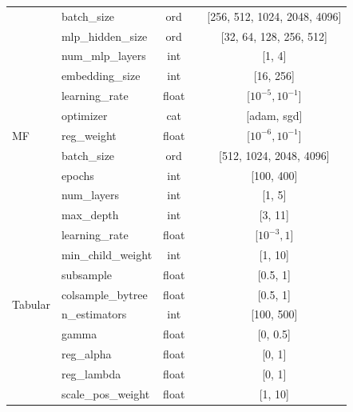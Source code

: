 \documentclass{article}
\newcommand{\cmark}{\ding{51}} %
\newcommand{\xmark}{\ding{55}} %
\begin{document}
\begin{longtable}{@{}p{}lccc@{}}
                                 & batch\_size        & ord   & \textcolor{crosscolor}{\xmark} & [256, 512, 1024, 2048, 4096] \\
                                 & mlp\_hidden\_size  & ord   & \textcolor{crosscolor}{\xmark} & [32, 64, 128, 256, 512] \\
                                 & num\_mlp\_layers   & int   & \textcolor{crosscolor}{\xmark} & [1, 4] \\
\midrule
\multirow{7}{*}{MF} & embedding\_size    & int   & \textcolor{crosscolor}{\xmark} & [16, 256] \\
                                 & learning\_rate     & float & \textcolor{checkcolor}{\cmark} & [$10^{-5}, 10^{-1}$] \\
                                 & optimizer            & cat   & \textcolor{crosscolor}{\xmark} & [adam, sgd] \\
                                 & reg\_weight        & float & \textcolor{checkcolor}{\cmark} & [$10^{-6}, 10^{-1}$] \\
                                 & batch\_size        & ord   & \textcolor{crosscolor}{\xmark} & [512, 1024, 2048, 4096] \\
                                 & epochs             & int   & \textcolor{crosscolor}{\xmark} & [100, 400] \\
                                 & num\_layers          & int   & \textcolor{crosscolor}{\xmark} & [1, 5] \\
\midrule
\multirow{10}{*}{Tabular} & max\_depth           & int   & \textcolor{crosscolor}{\xmark} & [3, 11] \\
                                  & learning\_rate       & float & \textcolor{checkcolor}{\cmark} & [$10^{-3}, 1$] \\
                                  & min\_child\_weight   & int   & \textcolor{crosscolor}{\xmark} & [1, 10] \\
                                  & subsample            & float & \textcolor{crosscolor}{\xmark} & [0.5, 1] \\
                                  & colsample\_bytree    & float & \textcolor{crosscolor}{\xmark} & [0.5, 1] \\
                                  & n\_estimators & int & \textcolor{crosscolor}{\xmark} & [100, 500] \\
& gamma & float & \textcolor{crosscolor}{\xmark} & [0, 0.5] \\
& reg\_alpha & float & \textcolor{crosscolor}{\xmark} & [0, 1] \\
& reg\_lambda & float & \textcolor{crosscolor}{\xmark} & [0, 1] \\
& scale\_pos\_weight & float & \textcolor{crosscolor}{\xmark} & [1, 10] \\
\midrule


\end{longtable}
\end{document}
